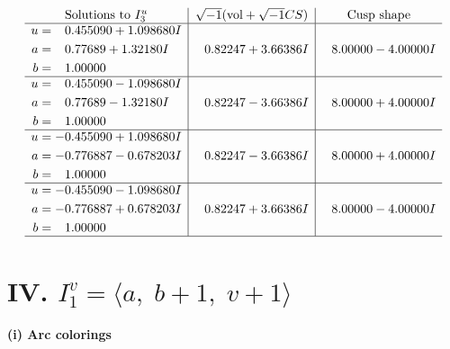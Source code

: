 \documentclass[1p]{elsarticle_modified}
\theoremstyle{definition}
\newcommand{\I}{\sqrt{-1}}
\begin{document}
$$\begin{array}{c|c|c}  
\text{Solutions to }I^u_{3}& \I (\text{vol} + \sqrt{-1}CS) & \text{Cusp shape}\\
 \hline 
\begin{aligned}
u &= \phantom{-}0.455090 + 1.098680 I \\
a &= \phantom{-}0.77689 + 1.32180 I \\
b &= \phantom{-}1.00000\phantom{ +0.000000I}\end{aligned}
 & \phantom{-}0.82247 + 3.66386 I & \phantom{-}8.00000 - 4.00000 I \\ \hline\begin{aligned}
u &= \phantom{-}0.455090 - 1.098680 I \\
a &= \phantom{-}0.77689 - 1.32180 I \\
b &= \phantom{-}1.00000\phantom{ +0.000000I}\end{aligned}
 & \phantom{-}0.82247 - 3.66386 I & \phantom{-}8.00000 + 4.00000 I \\ \hline\begin{aligned}
u &= -0.455090 + 1.098680 I \\
a &= -0.776887 - 0.678203 I \\
b &= \phantom{-}1.00000\phantom{ +0.000000I}\end{aligned}
 & \phantom{-}0.82247 - 3.66386 I & \phantom{-}8.00000 + 4.00000 I \\ \hline\begin{aligned}
u &= -0.455090 - 1.098680 I \\
a &= -0.776887 + 0.678203 I \\
b &= \phantom{-}1.00000\phantom{ +0.000000I}\end{aligned}
 & \phantom{-}0.82247 + 3.66386 I & \phantom{-}8.00000 - 4.00000 I\\
 \hline 
 \end{array}$$\newpage\newpage\renewcommand{\arraystretch}{1}
\centering \section*{IV. $I^v_{1}= \langle a,\;b+1,\;v+1 \rangle$}
\flushleft \textbf{(i) Arc colorings}\\
\end{document}
